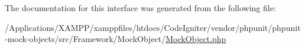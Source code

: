 The documentation for this interface was generated from the following file\+:\begin{DoxyCompactItemize}
\item 
/\+Applications/\+X\+A\+M\+P\+P/xamppfiles/htdocs/\+Code\+Igniter/vendor/phpunit/phpunit-\/mock-\/objects/src/\+Framework/\+Mock\+Object/\mbox{\hyperlink{_mock_object_8php}{Mock\+Object.\+php}}\end{DoxyCompactItemize}
